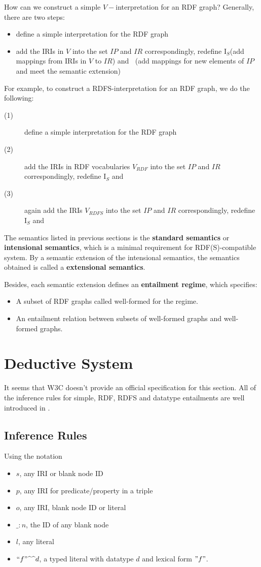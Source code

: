 \documentclass{article}
\DeclareMathOperator{\IEXT}{I_{EXT}}
\begin{document}
 How can we construct a simple $V-$interpretation for an RDF graph?
Generally, there are two steps:
\begin{itemize}
\item define a simple interpretation for the RDF graph
\item add the IRIs in $V$ into the set $IP$ and $IR$ correspondingly, redefine $\text{I}_S$(add mappings from IRIs in $V$ to $IR$) and $\IEXT$(add mappings for new elements of $IP$ and meet the semantic extension)
\end{itemize}
For example, to construct a RDFS-interpretation for an RDF graph, we do the following:
\begin{description}
\item[(1)]define a simple interpretation for the RDF graph
\item[(2)]add the IRIs in RDF vocabularies $V_{RDF}$ into the set $IP$ and $IR$ correspondingly, redefine $\text{I}_S$ and $\IEXT$
\item[(3)]again add the IRIs $V_{RDFS}$ into the set $IP$ and $IR$ correspondingly, redefine $\text{I}_S$ and $\IEXT$
\end{description}

 The semantics listed in previous sections is the \textbf{standard semantics} or \textbf{intensional semantics}, which is a minimal requirement for RDF(S)-compatible system. By a semantic extension of the intensional semantics, the semantics obtained is called a \textbf{extensional semantics}. \newline

 Besides, each semantic extension defines an \textbf{entailment regime}, which specifies:
\begin{itemize}
\item A subset of RDF graphs called well-formed for the regime.
\item An entailment relation between subsets of well-formed graphs and well-formed graphs.
\end{itemize}


\section{Deductive System}
It seems that W3C doesn't provide an official specification for this section. All of the inference rules for simple, RDF, RDFS and datatype entailments are well introduced in \cite{book}. 
\subsection{Inference Rules}
Using the notation
\begin{itemize}
\item $s$, any IRI or blank node ID
\item $p$, any IRI for predicate/property in a triple
\item $o$, any IRI, blank node ID or literal
\item $\_:n$, the ID of any blank node
\item $l$, any literal
\item $``f"\text{\textasciicircum \textasciicircum }d$, a typed literal with datatype $d$ and lexical form $"f"$.
\end{itemize}
\end{document}
